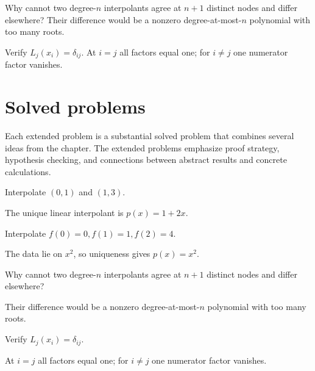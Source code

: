 \begin{example}\label{ex:ii20-worked-03}
Why cannot two degree-$n$ interpolants agree at $n+1$ distinct nodes and differ elsewhere? Their difference would be a nonzero degree-at-most-$n$ polynomial with too many roots.
\end{example}

\begin{example}\label{ex:ii20-worked-04}
Verify $L_j(x_i)=\delta_{ij}$. At $i=j$ all factors equal one; for $i\ne j$ one numerator factor vanishes.
\end{example}

\section{Solved problems}
Each extended problem is a substantial solved problem that combines several ideas from the chapter. The extended problems emphasize proof strategy, hypothesis checking, and connections between abstract results and concrete calculations.

\begin{problem}\label{prob:ii20-problem-01}
Interpolate $(0,1)$ and $(1,3)$.
\end{problem}
\begin{solution}
The unique linear interpolant is $p(x)=1+2x$.
\end{solution}

\begin{problem}\label{prob:ii20-problem-02}
Interpolate $f(0)=0,f(1)=1,f(2)=4$.
\end{problem}
\begin{solution}
The data lie on $x^2$, so uniqueness gives $p(x)=x^2$.
\end{solution}

\begin{problem}\label{prob:ii20-problem-03}
Why cannot two degree-$n$ interpolants agree at $n+1$ distinct nodes and differ elsewhere?
\end{problem}
\begin{solution}
Their difference would be a nonzero degree-at-most-$n$ polynomial with too many roots.
\end{solution}

\begin{problem}\label{prob:ii20-problem-04}
Verify $L_j(x_i)=\delta_{ij}$.
\end{problem}
\begin{solution}
At $i=j$ all factors equal one; for $i\ne j$ one numerator factor vanishes.
\end{solution}

